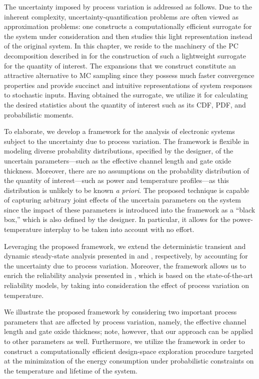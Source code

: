 The uncertainty imposed by process variation is addressed as follows. Due to the
inherent complexity, uncertainty-quantification problems are often viewed as
approximation problems: one constructs a computationally efficient surrogate for
the system under consideration and then studies this light representation
instead of the original system. In this chapter, we reside to the machinery of
the \acf{PC} decomposition described in  for the
construction of such a lightweight surrogate for the quantity of interest. The
expansions that we construct constitute an attractive alternative to \ac{MC}
sampling since they possess much faster convergence properties and provide
succinct and intuitive representations of system responses to stochastic inputs.
Having obtained the surrogate, we utilize it for calculating the desired
statistics about the quantity of interest such as its \acf{CDF}, \acf{PDF}, and
probabilistic moments.

To elaborate, we develop a framework for the analysis of electronic systems
subject to the uncertainty due to process variation. The framework is flexible
in modeling diverse probability distributions, specified by the designer, of the
uncertain parameters---such as the effective channel length and gate oxide
thickness. Moreover, there are no assumptions on the probability distribution of
the quantity of interest---such as power and temperature profiles---as this
distribution is unlikely to be known \emph{a priori}. The proposed technique is
capable of capturing arbitrary joint effects of the uncertain parameters on the
system since the impact of these parameters is introduced into the framework as
a ``black box,'' which is also defined by the designer. In particular, it allows
for the power-temperature interplay to be taken into account with no effort.

Leveraging the proposed framework, we extend the deterministic transient and
dynamic steady-state analysis presented in  and
, respectively, by accounting for the
uncertainty due to process variation. Moreover, the framework allows us to
enrich the reliability analysis presented in , which
is based on the state-of-the-art reliability models, by taking into
consideration the effect of process variation on temperature.

We illustrate the proposed framework by considering two important process
parameters that are affected by process variation, namely, the effective channel
length and gate oxide thickness; note, however, that our approach can be applied
to other parameters as well. Furthermore, we utilize the framework in order to
construct a computationally efficient design-space exploration procedure
targeted at the minimization of the energy consumption under probabilistic
constraints on the temperature and lifetime of the system.

